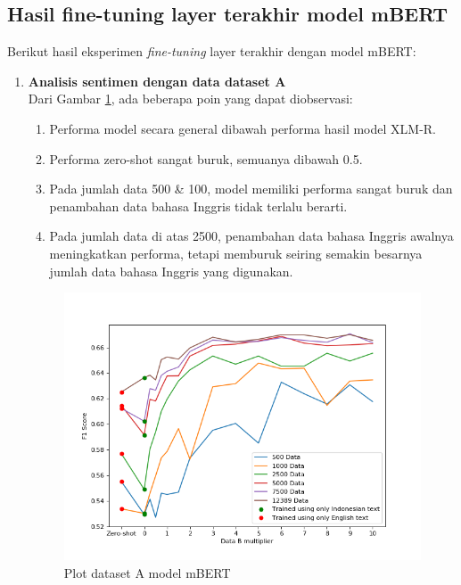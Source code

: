     \subsection{Hasil fine-tuning layer terakhir model mBERT}
        Berikut hasil eksperimen \textit{fine-tuning} layer terakhir dengan model mBERT: 
        \begin{enumerate}
            \item \textbf{Analisis sentimen dengan data dataset A} \\
            Dari Gambar \ref{fig:plot_head_trip_mbert}, ada beberapa poin yang dapat diobservasi:
            \begin{enumerate}
                \item Performa model secara general dibawah performa hasil model XLM-R.
                \item Performa zero-shot sangat buruk, semuanya dibawah 0.5.
                \item Pada jumlah data 500 \& 100, model memiliki performa sangat buruk dan penambahan data bahasa Inggris tidak terlalu berarti.
                \item Pada jumlah data di atas 2500, penambahan data bahasa Inggris awalnya meningkatkan performa, tetapi memburuk seiring semakin besarnya jumlah data bahasa Inggris yang digunakan.
            \end{enumerate}

            \begin{figure}[htb]
                \centering
                \includegraphics[width=\linewidth]{resources/plot-head-trip-mbert.png}
                \caption{Plot dataset A model mBERT}
                \label{fig:plot_head_trip_mbert}
            \end{figure}
            


\end{enumerate}
